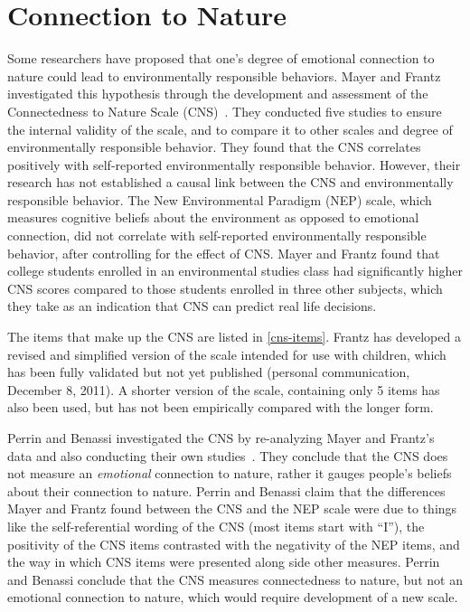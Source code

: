 \section{Connection to Nature}
\label{sec:connection-to-nature}

Some researchers have proposed that one's degree of emotional connection to nature could lead to environmentally responsible behaviors. Mayer and Frantz investigated this hypothesis through the development and assessment of the Connectedness to Nature Scale (CNS)~\cite{MayerFrantz2004}. They conducted five studies to ensure the internal validity of the scale, and to compare it to other scales and degree of environmentally responsible behavior. They found that the CNS correlates positively with self-reported environmentally responsible behavior. However, their research has not established a causal link between the CNS and environmentally responsible behavior. The New Environmental Paradigm (NEP) scale, which measures cognitive beliefs about the environment as opposed to emotional connection, did not correlate with self-reported environmentally responsible behavior, after controlling for the effect of CNS. Mayer and Frantz found that college students enrolled in an environmental studies class had significantly higher CNS scores compared to those students enrolled in three other subjects, which they take as an indication that CNS can predict real life decisions.

The items that make up the CNS are listed in \autoref{cns-items}. Frantz has developed a revised and simplified version of the scale intended for use with children, which has been fully validated but not yet published (personal communication, December 8, 2011). A shorter version of the scale, containing only 5 items has also been used, but has not been empirically compared with the longer form.

Perrin and Benassi investigated the CNS by re-analyzing Mayer and Frantz's data and also conducting their own studies~\cite{Perrin2009}. They conclude that the CNS does not measure an \emph{emotional} connection to nature, rather it gauges people's beliefs about their connection to nature. Perrin and Benassi claim that the differences Mayer and Frantz found between the CNS and the NEP scale were due to things like the self-referential wording of the CNS (most items start with ``I''), the positivity of the CNS items contrasted with the negativity of the NEP items, and the way in which CNS items were presented along side other measures. Perrin and Benassi conclude that the CNS measures connectedness to nature, but not an emotional connection to nature, which would require development of a new scale.

